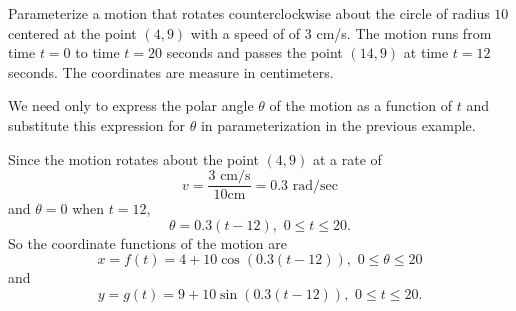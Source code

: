 \documentclass{ximera}
\begin{document}
\begin{example} \label{Ex12:Cosine}
Parameterize a motion that rotates counterclockwise about the circle of radius $10$ centered at the point $(4,9)$ with a speed of of $3$ cm/s. The motion runs from time $t=0$ to time $t=20$ seconds and passes the point $(14,9)$ at time $t=12$ seconds. The coordinates are measure in centimeters.

\begin{explanation}
We need only to express the polar angle $\theta$ of the motion as a function of $t$ and substitute this expression for $\theta$ in parameterization in the previous example.

Since the motion rotates about the point $(4,9)$ at a rate of
\[
    v = \frac{3 \text{ cm/s}}{10 \text{cm}} = 0.3 \text{ rad/sec} 
\]
and $\theta = 0$ when $t=12$, 
\[
   \theta = 0.3(t-12) , \,\, 0\leq t \leq 20 .
\]
So the coordinate functions of the motion are
\[
     x = f(t) = 4+ 10\cos (0.3(t-12)) ,  \,\,  0\leq \theta \leq 20
\]
and
\[
  y = g(t) = 9 + 10\sin (0.3(t-12))  , \,\,   0\leq t\leq 20 .
\]
\end{explanation}
\end{example}
\end{document}
